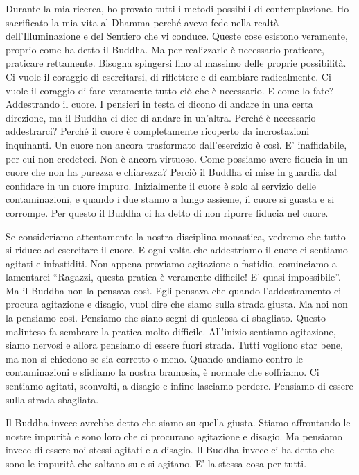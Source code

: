 Durante la mia ricerca, ho provato tutti i metodi possibili di
contemplazione. Ho sacrificato la mia vita al Dhamma perché avevo fede
nella realtà dell'Illuminazione e del Sentiero che vi conduce. Queste
cose esistono veramente, proprio come ha detto il Buddha. Ma per
realizzarle è necessario praticare, praticare rettamente. Bisogna
spingersi fino al massimo delle proprie possibilità. Ci vuole il
coraggio di esercitarsi, di riflettere e di cambiare radicalmente. Ci
vuole il coraggio di fare veramente tutto ciò che è necessario. E come
lo fate? Addestrando il cuore. I pensieri in testa ci dicono di andare
in una certa direzione, ma il Buddha ci dice di andare in un'altra.
Perché è necessario addestrarci? Perché il cuore è completamente
ricoperto da incrostazioni inquinanti. Un cuore non ancora trasformato
dall'esercizio è così. E' inaffidabile, per cui non credeteci. Non è
ancora virtuoso. Come possiamo avere fiducia in un cuore che non ha
purezza e chiarezza? Perciò il Buddha ci mise in guardia dal confidare
in un cuore impuro. Inizialmente il cuore è solo al servizio delle
contaminazioni, e quando i due stanno a lungo assieme, il cuore si
guasta e si corrompe. Per questo il Buddha ci ha detto di non riporre
fiducia nel cuore.

Se consideriamo attentamente la nostra disciplina monastica, vedremo che
tutto si riduce ad esercitare il cuore. E ogni volta che addestriamo il
cuore ci sentiamo agitati e infastiditi. Non appena proviamo agitazione
o fastidio, cominciamo a lamentarci ``Ragazzi, questa pratica è
veramente difficile! E' quasi impossibile''. Ma il Buddha non la pensava
così. Egli pensava che quando l'addestramento ci procura agitazione e
disagio, vuol dire che siamo sulla strada giusta. Ma noi non la pensiamo
così. Pensiamo che siano segni di qualcosa di sbagliato. Questo
malinteso fa sembrare la pratica molto difficile. All'inizio sentiamo
agitazione, siamo nervosi e allora pensiamo di essere fuori strada.
Tutti vogliono star bene, ma non si chiedono se sia corretto o meno.
Quando andiamo contro le contaminazioni e sfidiamo la nostra bramosia, è
normale che soffriamo. Ci sentiamo agitati, sconvolti, a disagio e
infine lasciamo perdere. Pensiamo di essere sulla strada sbagliata.

Il Buddha invece avrebbe detto che siamo su quella giusta. Stiamo
affrontando le nostre impurità e sono loro che ci procurano agitazione e
disagio. Ma pensiamo invece di essere noi stessi agitati e a disagio. Il
Buddha invece ci ha detto che sono le impurità che saltano su e si
agitano. E' la stessa cosa per tutti.

